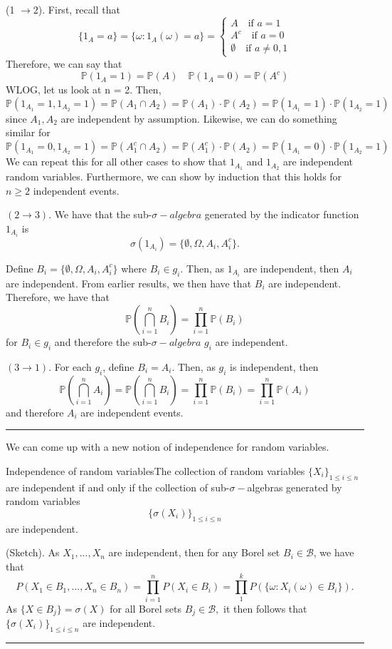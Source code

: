 \documentclass[twoside]{article}
\newenvironment{proof}{{\bf Proof:}}{\hfill\rule{2mm}{2mm}}
\newcommand{\borelsigmaalgebra}{\mathcal{B}}
\newcommand{\sa}{\sigma-algebra}
\newcommand{\prob}{\mathbb{P}}
\begin{document}
\begin{proof} (1 $\rightarrow 2$). First, recall that 
$$
\{1_A = a\} = \{\omega: 1_A(\omega) = a\} = 
\begin{cases}
A \quad \text{if }a = 1\\
A^c \quad \text{if }a = 0\\
\emptyset \quad \text{if }a \neq 0, 1
\end{cases}
$$
Therefore, we can say that 
$$
\prob(1_A = 1) = \prob(A) \quad \prob(1_A = 0) = \prob(A^c)
$$
WLOG, let us look at n = 2. Then,
$$
\prob(1_{A_{1}} = 1, 1_{A_{2}} = 1) = \prob(A_1 \cap A_2) = \prob(A_1)\cdot \prob(A_2) = \prob(1_{A_{1}} = 1)\cdot \prob(1_{A_{2}} = 1)
$$
since $A_1, A_2$ are independent by assumption. Likewise, we can do something similar for 
$$
\prob(1_{A_{1}} = 0, 1_{A_{2}} = 1) = \prob(A_1^c \cap A_2) = \prob(A_1^c)\cdot \prob(A_2) = \prob(1_{A_{1}} = 0)\cdot \prob(1_{A_{2}} = 1)
$$
We can repeat this for all other cases to show that $1_{A_{1}}$ and $1_{A_{2}}$ are independent random variables. Furthermore, we can show by induction that this holds for $n \geq 2$ independent events.
\newline 

$(2 \rightarrow 3).$ We have that the sub-$\sa$ generated by the indicator function $1_{A_{i}}$ is 
$$
\sigma(1_{A_i}) = \{\emptyset, \Omega, A_i, A_i^c\}.
$$

Define $B_i = \{\emptyset, \Omega, A_i, A_i^c\}$ where $B_i \in g_i.$ Then, as $1_{A_{i}}$ are independent, then $A_i$ are independent. From earlier results, we then have that $B_i$ are independent. Therefore, we have that 
$$
\prob(\bigcap_{i=1}^{n}B_i) = \prod_{i=1}^{n}\prob(B_i)
$$
for $B_i \in g_i$ and therefore the sub-$\sa$ $g_i$ are independent.
\newline 

$(3 \rightarrow 1).$ For each $g_i$, define $B_i = A_i.$ Then, as $g_i$ is independent, then 
$$
\prob(\bigcap_{i=1}^{n}A_i) = \prob(\bigcap_{i=1}^{n}B_i) = \prod_{i=1}^{n}\prob(B_i) = \prod_{i=1}^{n}\prob(A_i)
$$
and therefore $A_i$ are independent events.
\end{proof}

We can come up with a new notion of independence for random variables.
\begin{theorem_exam}{Independence of random variables}{}The collection of random variables $\{X_i\}_{1 \leq i \leq n}$ are independent if and only if the collection of sub-$\sigma-$algebras generated by random variables $$\{\sigma(X_i)\}_{1 \leq i \leq n}$$ are independent.
\end{theorem_exam}
\begin{proof}(Sketch). As $X_1,...,X_n$ are independent, then for any Borel set $B_i \in \mathcal{B}$, we have that
$$
P(X_1 \in B_1, ..., X_n \in B_n) = \prod_{i=1}^{n}P(X_i \in B_i)  = \prod_{1}^kP(\{\omega: X_i(\omega) \in B_i\}).
$$
As $\{X \in B_j\} = \sigma(X)$ for all Borel sets $B_j \in \borelsigmaalgebra,$ it then follows that $\{\sigma(X_i)\}_{1 \leq i \leq n}$ are independent.
\end{proof}
\end{document}
